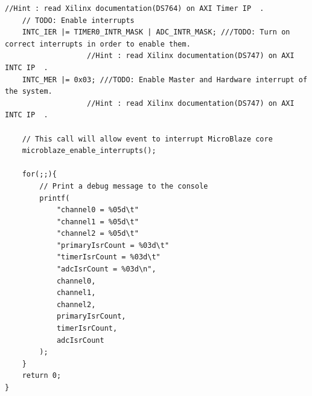 \documentclass[twoside]{article}
\begin{document}
\begin{lstlisting}[frame=single]
	//Hint : read Xilinx documentation(DS764) on AXI Timer IP  .
	// TODO: Enable interrupts
	INTC_IER |= TIMER0_INTR_MASK | ADC_INTR_MASK; ///TODO: Turn on correct interrupts in order to enable them.
	               //Hint : read Xilinx documentation(DS747) on AXI INTC IP  .
	INTC_MER |= 0x03; ///TODO: Enable Master and Hardware interrupt of the system.
	               //Hint : read Xilinx documentation(DS747) on AXI INTC IP  .

	// This call will allow event to interrupt MicroBlaze core
	microblaze_enable_interrupts();

	for(;;){
		// Print a debug message to the console
		printf(
			"channel0 = %05d\t"
			"channel1 = %05d\t"
			"channel2 = %05d\t"
			"primaryIsrCount = %03d\t"
			"timerIsrCount = %03d\t"
			"adcIsrCount = %03d\n",
			channel0,
			channel1,
			channel2,
			primaryIsrCount,
			timerIsrCount,
			adcIsrCount
		);
	}
    return 0;
}
\end{lstlisting}
\end{document}
